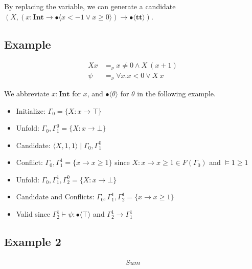 \documentclass[runningheads]{llncs}
\newcommand \true {\textbf{tt}}
\newcommand \stypeint {\textbf{Int}}
\newcommand \stypebool {\bullet}
\newcommand \typeint[1]{{#1} : \stypeint}
\newcommand \typebool[1]{\stypebool \langle #1 \rangle}
\begin{document}
By replacing the variable, we can generate a candidate
\( (X, (\typeint{x} \to \typebool{x < -1 \lor x \geq 0}) \rightarrow
\typebool{\true}) \).

\subsection{Example}

\begin{align*}
    X x &=_\nu x \neq 0 \land X\ (x + 1) \\
    \psi  &=_\nu \forall x. x < 0 \lor X\ x
\end{align*}

We abbreviate \(\typeint{x}\) for \(x\), and \(\typebool{\theta}\) for
\(\theta\) in the following example.

\begin{itemize}
    \item Initialize: \(\Gamma_0 = \{X: x \rightarrow \top\}\)
    \item Unfold: \(\Gamma_0, \Gamma_1^0 = \{X: x \rightarrow \bot\}\)
    \item Candidate: \(\langle X, 1, 1 \rangle \mid \Gamma_0, \Gamma_1^0\)
    \item Conflict: \(\Gamma_0, \Gamma_1^1 = \{x \rightarrow x \geq 1\}\)
        since \(X: x \rightarrow x \geq 1 \in F(\Gamma_0)\) and \(\models 1 \geq 1\)
    \item Unfold: \(\Gamma_0, \Gamma_1^1, \Gamma_2^0 = \{X: x \rightarrow \bot\}\)
    \item Candidate and Conflicts: \(\Gamma_0, \Gamma_1^1, \Gamma_2^1 = \{x \rightarrow x \geq 1\}\)
    \item Valid since \(\Gamma_2^1 \vdash \psi: \typebool{\top} \)
        and \(\Gamma_2^1 \rightarrow \Gamma_1^1\)
\end{itemize}

\subsection{Example 2}

\begin{align*}
    Sum
\end{align*}
\end{document}
